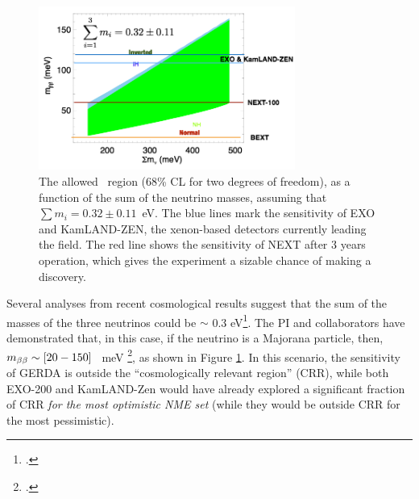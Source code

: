 \begin{figure}
\centering
\includegraphics[width=0.75\textwidth]{img/SensiCRR.png}
\caption{\small The allowed \mbb\ region (68\% CL for two degrees of freedom), as a function of the sum of the neutrino masses, assuming that 
$\sum m_i = 0.32\pm 0.11$~eV. The blue lines mark the sensitivity of EXO and KamLAND-ZEN, the xenon-based detectors currently leading the field. The red line shows the sensitivity of NEXT after 3 years operation, which gives the experiment a sizable chance of making a discovery.} 
\label{fig.mbb}
\end{figure}

 Several analyses from recent cosmological results suggest that the sum of the masses of the three neutrinos could be $\sim$ 0.3 eV\footcite{PhysRevLett.112.051303}. The PI and collaborators have demonstrated that, in this case, if the neutrino is a Majorana particle, then, $m_{\beta\beta} \sim [20-150]$~ meV \footcite{GomezCadenas:2013ue}, as shown in Figure \ref{fig.mbb}. In this scenario, the sensitivity of GERDA is outside the ``cosmologically relevant region'' (CRR), while both EXO-200 and KamLAND-Zen would have already explored a significant fraction of CRR {\em for the most optimistic NME set} (while they would be outside CRR for the most pessimistic). 
 
% 
 
